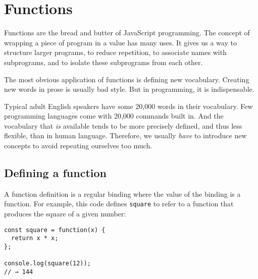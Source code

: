 \chapter{Functions}\label{functions}


Functions are the bread and butter of JavaScript programming. The concept of wrapping a piece of program in a value has many uses. It gives us a way to structure larger programs, to reduce repetition, to associate names with subprograms, and to isolate these subprograms from each other.

The most obvious application of functions is defining new vocabulary. Creating new words in prose is usually bad style. But in programming, it is indispensable.

Typical adult English speakers have some 20,000 words in their vocabulary. Few programming languages come with 20,000 commands built in. And the vocabulary that \emph{is} available tends to be more precisely defined, and thus less flexible, than in human language. Therefore, we usually \emph{have} to introduce new concepts to avoid repeating ourselves too much.

\section{Defining a function}

A function definition is a regular binding where the value of the binding is a function. For example, this code defines \lstinline`square` to refer to a function that produces the square of a given number:

\begin{lstlisting}
const square = function(x) {
  return x * x;
};

console.log(square(12));
// → 144
\end{lstlisting}
\noindent{}

